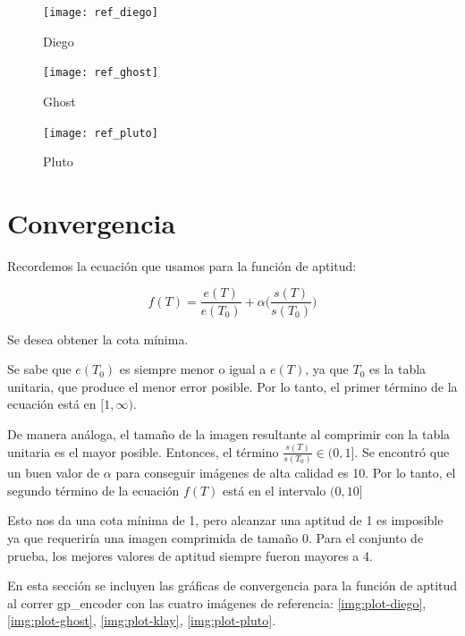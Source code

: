 \begin{figure}[b]
    \texttt{[image: ref\_diego]}
    \caption{Diego}
    \label{fig:ref-diego}
\end{figure}

\begin{figure}[b]
    \texttt{[image: ref\_ghost]}
    \caption{Ghost}
    \label{fig:ref-ghost}
\end{figure}

\begin{figure}[b]
    \texttt{[image: ref\_pluto]}
    \caption{Pluto}
    \label{fig:ref-pluto}
\end{figure}


\section{Convergencia}

Recordemos la ecuación que usamos para la función de aptitud:

\begin{equation}
f(T) = \frac{e(T)}{e(T_0)} + \alpha \Big(\frac{s(T)}{s(T_0)}\Big)
\end{equation}\label{eq:fitness-repeated}

Se desea obtener la cota mínima.

Se sabe que $e(T_0)$ es siempre menor o igual a $e(T)$, ya que $T_0$ es la
tabla unitaria, que produce el menor error posible. Por lo tanto, el primer término
de la ecuación está en $[1, \infty)$.

De manera análoga, el tamaño de la imagen resultante al comprimir con la tabla
unitaria es el mayor posible. Entonces, el término $\frac{s(T)}{s(T_0)} \in (0,
1]$. Se encontró que un buen valor de $\alpha$ para conseguir imágenes de alta
calidad es 10. Por lo tanto, el segundo término de la ecuación $f(T)$ está en
el intervalo $(0, 10]$

Esto nos da una cota mínima de 1, pero alcanzar una aptitud de 1 es imposible
ya que requeriría una imagen comprimida de tamaño 0. Para el conjunto de
prueba, los mejores valores de aptitud siempre fueron mayores a 4.

En esta sección se incluyen las gráficas de convergencia para la función de
aptitud al correr gp\_encoder con las cuatro imágenes de referencia:
\ref{img:plot-diego}, \ref{img:plot-ghost}, \ref{img:plot-klay}, \ref{img:plot-pluto}.

